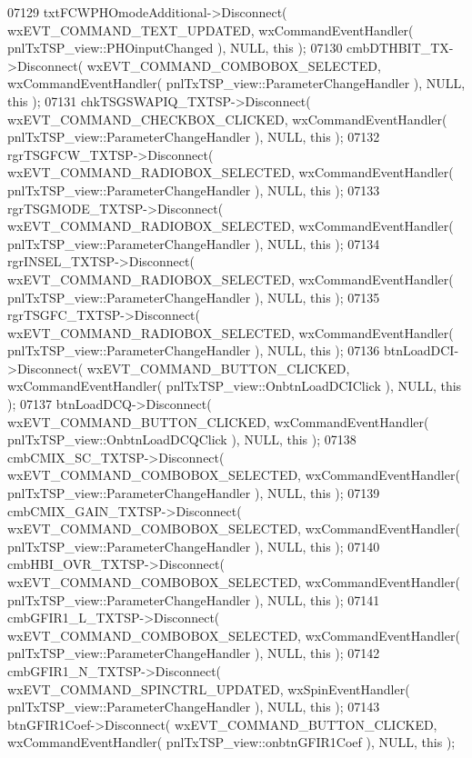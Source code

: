 \begin{DoxyCode}
07129     txtFCWPHOmodeAdditional->Disconnect( wxEVT\_COMMAND\_TEXT\_UPDATED, wxCommandEventHandler( 
      pnlTxTSP_view::PHOinputChanged ), NULL, \textcolor{keyword}{this} );
07130     cmbDTHBIT_TX->Disconnect( wxEVT\_COMMAND\_COMBOBOX\_SELECTED, wxCommandEventHandler( 
      pnlTxTSP_view::ParameterChangeHandler ), NULL, \textcolor{keyword}{this} );
07131     chkTSGSWAPIQ_TXTSP->Disconnect( wxEVT\_COMMAND\_CHECKBOX\_CLICKED, wxCommandEventHandler( 
      pnlTxTSP_view::ParameterChangeHandler ), NULL, \textcolor{keyword}{this} );
07132     rgrTSGFCW_TXTSP->Disconnect( wxEVT\_COMMAND\_RADIOBOX\_SELECTED, wxCommandEventHandler( 
      pnlTxTSP_view::ParameterChangeHandler ), NULL, \textcolor{keyword}{this} );
07133     rgrTSGMODE_TXTSP->Disconnect( wxEVT\_COMMAND\_RADIOBOX\_SELECTED, wxCommandEventHandler( 
      pnlTxTSP_view::ParameterChangeHandler ), NULL, \textcolor{keyword}{this} );
07134     rgrINSEL_TXTSP->Disconnect( wxEVT\_COMMAND\_RADIOBOX\_SELECTED, wxCommandEventHandler( 
      pnlTxTSP_view::ParameterChangeHandler ), NULL, \textcolor{keyword}{this} );
07135     rgrTSGFC_TXTSP->Disconnect( wxEVT\_COMMAND\_RADIOBOX\_SELECTED, wxCommandEventHandler( 
      pnlTxTSP_view::ParameterChangeHandler ), NULL, \textcolor{keyword}{this} );
07136     btnLoadDCI->Disconnect( wxEVT\_COMMAND\_BUTTON\_CLICKED, wxCommandEventHandler( 
      pnlTxTSP_view::OnbtnLoadDCIClick ), NULL, \textcolor{keyword}{this} );
07137     btnLoadDCQ->Disconnect( wxEVT\_COMMAND\_BUTTON\_CLICKED, wxCommandEventHandler( 
      pnlTxTSP_view::OnbtnLoadDCQClick ), NULL, \textcolor{keyword}{this} );
07138     cmbCMIX_SC_TXTSP->Disconnect( wxEVT\_COMMAND\_COMBOBOX\_SELECTED, wxCommandEventHandler( 
      pnlTxTSP_view::ParameterChangeHandler ), NULL, \textcolor{keyword}{this} );
07139     cmbCMIX_GAIN_TXTSP->Disconnect( wxEVT\_COMMAND\_COMBOBOX\_SELECTED, wxCommandEventHandler( 
      pnlTxTSP_view::ParameterChangeHandler ), NULL, \textcolor{keyword}{this} );
07140     cmbHBI_OVR_TXTSP->Disconnect( wxEVT\_COMMAND\_COMBOBOX\_SELECTED, wxCommandEventHandler( 
      pnlTxTSP_view::ParameterChangeHandler ), NULL, \textcolor{keyword}{this} );
07141     cmbGFIR1_L_TXTSP->Disconnect( wxEVT\_COMMAND\_COMBOBOX\_SELECTED, wxCommandEventHandler( 
      pnlTxTSP_view::ParameterChangeHandler ), NULL, \textcolor{keyword}{this} );
07142     cmbGFIR1_N_TXTSP->Disconnect( wxEVT\_COMMAND\_SPINCTRL\_UPDATED, wxSpinEventHandler( 
      pnlTxTSP_view::ParameterChangeHandler ), NULL, \textcolor{keyword}{this} );
07143     btnGFIR1Coef->Disconnect( wxEVT\_COMMAND\_BUTTON\_CLICKED, wxCommandEventHandler( 
      pnlTxTSP_view::onbtnGFIR1Coef ), NULL, \textcolor{keyword}{this} );

\end{DoxyCode}
